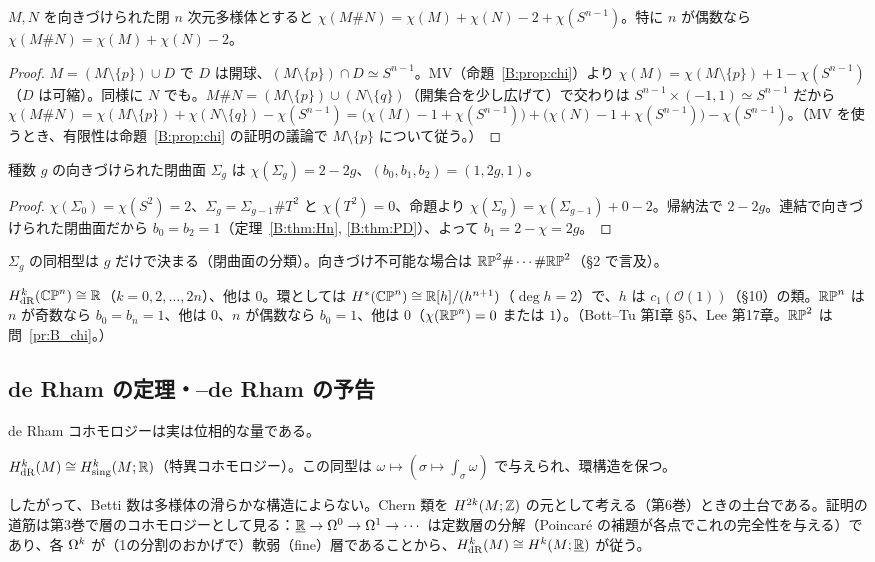 \begin{prop}\label{B:prop:csum}\tP
$M,N$ を向きづけられた閉 $n$ 次元多様体とすると $\chi(M\#N)=\chi(M)+\chi(N)-2+\chi(S^{n-1})$。特に $n$ が偶数なら $\chi(M\#N)=\chi(M)+\chi(N)-2$。
\end{prop}
\begin{proof}
$M=(M\setminus\{p\})\cup D$ で $D$ は開球、$(M\setminus\{p\})\cap D\simeq S^{n-1}$。MV（命題~\ref{B:prop:chi}）より $\chi(M)=\chi(M\setminus\{p\})+1-\chi(S^{n-1})$（$D$ は可縮）。同様に $N$ でも。$M\#N=(M\setminus\{p\})\cup(N\setminus\{q\})$（開集合を少し広げて）で交わりは $S^{n-1}\times(-1,1)\simeq S^{n-1}$ だから $\chi(M\#N)=\chi(M\setminus\{p\})+\chi(N\setminus\{q\})-\chi(S^{n-1})=\bigl(\chi(M)-1+\chi(S^{n-1})\bigr)+\bigl(\chi(N)-1+\chi(S^{n-1})\bigr)-\chi(S^{n-1})$。（MV を使うとき、有限性は命題~\ref{B:prop:chi} の証明の議論で $M\setminus\{p\}$ について従う。）
\end{proof}
\begin{cor}\label{B:cor:Sigma}\tP
種数 $g$ の向きづけられた閉曲面 $\Sigma_g$ は $\chi(\Sigma_g)=2-2g$、$(b_0,b_1,b_2)=(1,2g,1)$。
\end{cor}
\begin{proof}
$\chi(\Sigma_0)=\chi(S^2)=2$、$\Sigma_g=\Sigma_{g-1}\#T^2$ と $\chi(T^2)=0$、命題より $\chi(\Sigma_g)=\chi(\Sigma_{g-1})+0-2$。帰納法で $2-2g$。連結で向きづけられた閉曲面だから $b_0=b_2=1$（定理~\ref{B:thm:Hn}, \ref{B:thm:PD}）、よって $b_1=2-\chi=2g$。
\end{proof}
$\Sigma_g$ の同相型は $g$ だけで決まる（閉曲面の分類）\tC。向きづけ不可能な場合は $\mathbb{RP}^2\#\cdots\#\mathbb{RP}^2$（§2 で言及）。

\begin{ex}[射影空間：主張]\label{B:ex:proj}\tC
$H^k_{\rm dR}(\mathbb{CP}^n)\cong\mathbb R$（$k=0,2,\dots,2n$）、他は $0$。環としては $H^*(\mathbb{CP}^n)\cong\mathbb R[h]/(h^{n+1})$（$\deg h=2$）で、$h$ は $c_1(\mathcal O(1))$（§10）の類。$\mathbb{RP}^n$ は $n$ が奇数なら $b_0=b_n=1$、他は $0$、$n$ が偶数なら $b_0=1$、他は $0$（$\chi(\mathbb{RP}^n)=0$ または $1$）。（Bott--Tu 第I章 §5、Lee 第17章。$\mathbb{RP}^2$ は問~\ref{pr:B_chi}。）
\end{ex}

\subsection{de Rham の定理・{\Cech}--de Rham の予告}\label{B:ss:cech}

de Rham コホモロジーは実は位相的な量である。
\begin{thm}\label{B:thm:dRthm}\tC
$H^k_{\rm dR}(M)\cong H^k_{\rm sing}(M;\mathbb R)$（特異コホモロジー）。この同型は $\omega\mapsto(\sigma\mapsto\int_\sigma\omega)$ で与えられ、環構造を保つ。
\end{thm}
したがって、Betti 数は多様体の滑らかな構造によらない。Chern 類を $H^{2k}(M;\mathbb Z)$ の元として考える（第6巻）ときの土台である。証明の道筋は第3巻で層のコホモロジーとして見る：$\underline{\mathbb R}\to\Omega^0\to\Omega^1\to\cdots$ は定数層の分解（Poincaré の補題が各点でこれの完全性を与える）であり、各 $\Omega^k$ が（1の分割のおかげで）軟弱（fine）層であることから、$H^k_{\rm dR}(M)\cong H^k(M;\underline{\mathbb R})$ が従う。

